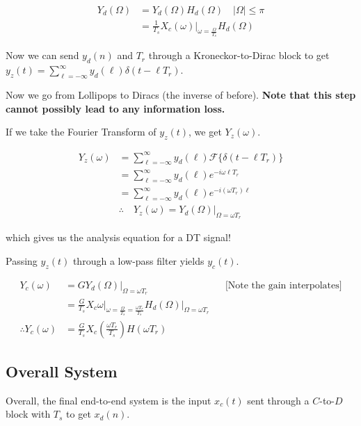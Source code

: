 \begin{align*}
    Y_d(\Omega)
    &=
    Y_d(\Omega) H_d(\Omega)\quad |\Omega|\leq \pi
    \\
    &=
    \frac1{T_s} X_c(\omega) \Big|_{\omega=\frac\Omega{T_s}}H_d(\Omega)
\end{align*}

\hrulefill

Now we can send $y_d(n)$ and $T_r$ through a Kroneckor-to-Dirac block to get $y_z(t)=\displaystyle\sum_{\ell=-\infty}^\infty y_d(\ell)\delta(t-\ell T_r)$. 

Now we go from Lollipops to Diracs (the inverse of before). \textbf{Note that this step cannot possibly lead to any information loss.}

If we take the Fourier Transform of $y_z(t)$, we get $Y_z(\omega)$.

\begin{align*}
    Y_z(\omega)
    &=\sum_{\ell=-\infty}^\infty y_d(\ell) \mathcal F\{\delta(t-\ell T_r)\} \\
    &= \sum_{\ell=-\infty}^\infty y_d(\ell) e^{-i\omega\ell T_r} \\
    &= \sum_{\ell=-\infty}^\infty y_d(\ell) e^{-i(\omega T_r)\ell} \\
    &\therefore\quad Y_z(\omega)=Y_d(\Omega)\Big|_{\Omega=\omega T_r}
\end{align*}

which gives us the analysis equation for a DT signal!

Passing $y_z(t)$ through a low-pass filter yields $y_c(t)$.

\begin{align*}
    Y_c(\omega) 
    &= G Y_d(\Omega)\Big|_{\Omega=\omega T_r}
    &&\text{[Note the gain interpolates]}
    \\
    &= \frac G{T_s} X_c{\omega}\Big|_{\omega=\frac\Omega{T_s}=\frac{\omega T_r}{T_s}}
    H_d(\Omega)\Big|_{\Omega=\omega T_r}
    \\
    \therefore
    Y_c(\omega) 
    &= \frac G{T_s}X_c\left(\frac{\omega T_r}{T_s}\right) H\left({\omega T_r}\right)
\end{align*}

\hrulefill

\subsection{Overall System}

Overall, the final end-to-end system is the input $x_c(t)$ sent through a $C$-to-$D$ block with $T_s$ to get $x_d(n)$.

